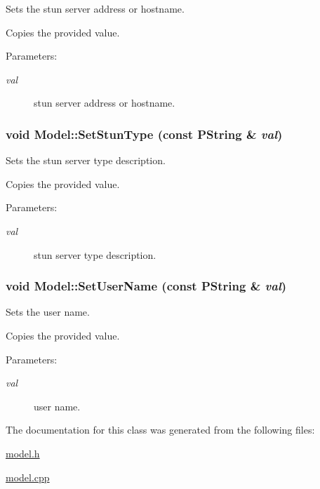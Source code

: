 Sets the stun server address or hostname. 

Copies the provided value. \begin{Desc}
\item[Parameters:]
\begin{description}
\item[{\em val}]stun server address or hostname. \end{description}
\end{Desc}
\hypertarget{classModel_d2fd66a01c2cea8bc295567da8998733}{
\subsubsection[{SetStunType}]{\setlength{\rightskip}{0pt plus 5cm}void Model::SetStunType (const PString \& {\em val})}}
\label{classModel_d2fd66a01c2cea8bc295567da8998733}


Sets the stun server type description. 

Copies the provided value. \begin{Desc}
\item[Parameters:]
\begin{description}
\item[{\em val}]stun server type description. \end{description}
\end{Desc}
\hypertarget{classModel_de7353a1170fbb7f587c069270be7f7a}{
\subsubsection[{SetUserName}]{\setlength{\rightskip}{0pt plus 5cm}void Model::SetUserName (const PString \& {\em val})}}
\label{classModel_de7353a1170fbb7f587c069270be7f7a}


Sets the user name. 

Copies the provided value. \begin{Desc}
\item[Parameters:]
\begin{description}
\item[{\em val}]user name. \end{description}
\end{Desc}


The documentation for this class was generated from the following files:\begin{CompactItemize}
\item 
\hyperlink{model_8h}{model.h}\item 
\hyperlink{model_8cpp}{model.cpp}\end{CompactItemize}
